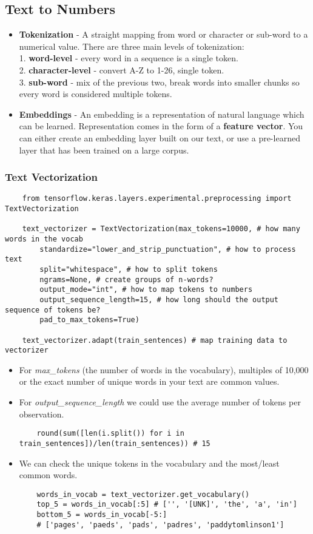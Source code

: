 \documentclass[11pt, a4paper]{article}
\begin{document}
	\subsection{Text to Numbers}
	\begin{itemize}
		\item \textbf{Tokenization} - A straight mapping from word or character or sub-word to a numerical value. There are three main levels of tokenization: \\
		1. \textbf{word-level} - every word in a sequence is a single token.\\
		2. \textbf{character-level} - convert A-Z to 1-26, single token.\\
		3. \textbf{sub-word} - mix of the previous two, break words into smaller chunks so every word is considered multiple tokens.
		\item \textbf{Embeddings} - An embedding is a representation of natural language which can be learned. Representation comes in the form of a \textbf{feature vector}. You can either create an embedding layer built on our text, or use a pre-learned layer that has been trained on a large corpus.
	\end{itemize}
	\subsubsection{Text Vectorization}
	\begin{lstlisting}
	from tensorflow.keras.layers.experimental.preprocessing import TextVectorization
	
	text_vectorizer = TextVectorization(max_tokens=10000, # how many words in the vocab
		standardize="lower_and_strip_punctuation", # how to process text
		split="whitespace", # how to split tokens
		ngrams=None, # create groups of n-words?
		output_mode="int", # how to map tokens to numbers
		output_sequence_length=15, # how long should the output sequence of tokens be?
		pad_to_max_tokens=True)
		
	text_vectorizer.adapt(train_sentences) # map training data to vectorizer \end{lstlisting}
	\begin{itemize}
		\item For \textit{max\_tokens} (the number of words in the vocabulary), multiples of 10,000 or the exact number of unique words in your text are common values.
		\item For \textit{output\_sequence\_length} we could use the average number of tokens per observation.
	\begin{lstlisting}
	round(sum([len(i.split()) for i in train_sentences])/len(train_sentences)) # 15 \end{lstlisting}
		\item We can check the unique tokens in the vocabulary and the most/least common words.
	\begin{lstlisting}
	words_in_vocab = text_vectorizer.get_vocabulary()
	top_5 = words_in_vocab[:5] # ['', '[UNK]', 'the', 'a', 'in']
	bottom_5 = words_in_vocab[-5:] 
	# ['pages', 'paeds', 'pads', 'padres', 'paddytomlinson1'] \end{lstlisting}
	\end{itemize}
\end{document}
